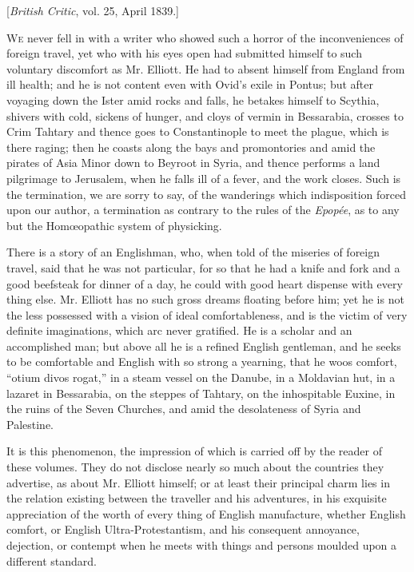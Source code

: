 
[\emph{British
Critic}, vol. 25, April 1839.]

W\textsc{e}
never fell in with a writer who showed such a horror of the
inconveniences of foreign travel, yet who with his eyes open had
submitted himself to such voluntary discomfort as Mr. Elliott. He had to
absent himself from England from ill health; and he is not content even
with Ovid's exile in Pontus; but after voyaging down the Ister amid
rocks and falls, he betakes himself to Scythia, shivers with cold,
sickens of hunger, and cloys of vermin in Bessarabia, crosses to Crim
Tahtary and thence goes to Constantinople to meet the plague, which is
there raging; then he coasts along the bays and promontories and amid
the pirates of Asia Minor down to Beyroot in Syria, and thence performs
a land pilgrimage to Jerusalem, when he falls ill of a fever, and the
work closes. Such is the termination, we are sorry to say, of the
wanderings which indisposition forced upon our author, a termination as
contrary to the rules of the \emph{Epopée}, as to any but the Homœopathic
system of physicking.

There is a
story of an Englishman, who, when told of the miseries of foreign
travel, said that he was not particular, for so that he had a knife and
fork and a good beefsteak for dinner of a day, he could with good heart
dispense with every thing else. Mr. Elliott has no such gross dreams
floating before him; yet he is not the less possessed with a vision of
ideal comfortableness, and is the victim of very definite imaginations,
which arc never gratified. He is a scholar and an accomplished man; but
above all he is a refined English gentleman, and he seeks to be
comfortable and English with so strong a yearning, that he woos
comfort, ``otium divos rogat,'' in a steam vessel on the Danube, in a
Moldavian hut, in a lazaret in Bessarabia, on the steppes of Tahtary, on
the inhospitable Euxine, in the ruins of the Seven Churches, and amid
the desolateness of Syria and Palestine.

It is this
phenomenon, the impression of which is carried off by the reader of
these volumes. They do not disclose nearly so much about the countries
they advertise, as about Mr. Elliott himself; or at least their
principal charm lies in the relation existing between the traveller and
his adventures, in his exquisite appreciation of the worth of every
thing of English manufacture, whether English comfort, or English
Ultra-Protestantism, and his consequent annoyance, dejection, or
contempt when he meets with things and persons moulded upon a different
standard.

